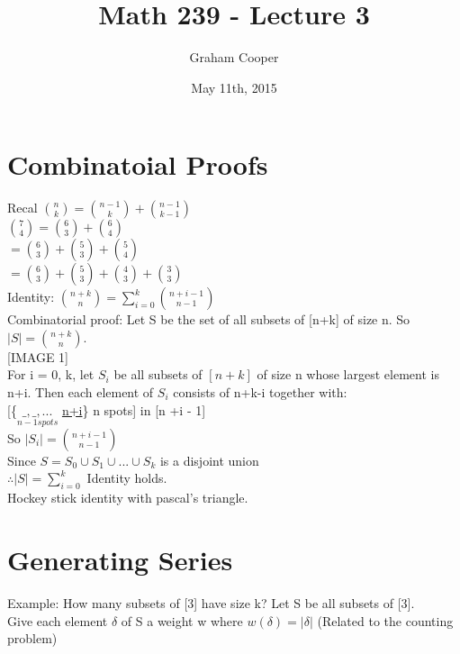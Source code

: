 \documentclass[12pt]{article}
\title{\vspace{-15ex}Math 239 - Lecture 3\vspace{-1ex}}
\date{May 11th, 2015}
\author{Graham Cooper}
\begin{document}
	\maketitle
	\section*{Combinatoial Proofs}
	Recal ${n \choose k} = {n-1 \choose k} + {n-1 \choose k-1}$\\
	${7 \choose 4} = {6 \choose 3} + {6 \choose 4}$\\
	$= {6 \choose 3} + {5 \choose 3} + {5 \choose 4}$\\
	$= {6 \choose 3} + {5 \choose 3} + {4 \choose 3} + {3 \choose 3}$\\
	
	Identity: $ {n+k \choose n} = \sum_{i=0}^{k}{n+i - 1 \choose n-1}$\\
	
	Combinatorial proof: Let S be the set of all subsets of [n+k] of size n. So $|S| = {n+k \choose n}$.\\
	
	[IMAGE 1]\\
	
	For i = 0, k, let $S_i$ be all subsets of $[n+k]$ of size n whose largest element is n+i. Then each element of $S_i$ consists of n+k-i together with:\\
	
	[\{$\underset{n-1 spots}{\_,\_, ...}$ \underline{n+i}\} n spots] in [n +i - 1]\\
	So $|S_i| = {n+i-1 \choose n-1}$\\
	Since $S = S_0 \cup S_1 \cup ... \cup S_k$ is a disjoint union\\
	$\therefore |S| = \sum_{i=0}^{k}$ Identity holds.\\
	
	Hockey stick identity with pascal's triangle.\\
	
	\section*{Generating Series}
	Example: How many subsets of [3] have size k? Let S be all subsets of [3].\\
	
	Give each element $\delta$ of S a weight w where $w(\delta) = |\delta|$ (Related to the counting problem)\\
	
\end{document}
